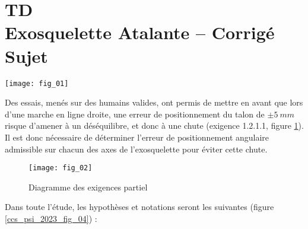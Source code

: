 \chapter*{TD  \\ 
Exosquelette Atalante -- \ifprof Corrigé \else Sujet \fi}

\iflivret {} \else
\ifprof  {} \else \fi
\fi






\begin{marginfigure}
\centering
\texttt{[image: fig\_01]}
\end{marginfigure}

Des essais, menés sur des humains valides, ont permis de mettre en avant que lors d'une marche en ligne droite, une erreur de positionnement du talon de $\pm \SI{5}{mm}$ risque d'amener à un déséquilibre, et donc à une chute (exigence 1.2.1.1, figure \ref{ccs_psi_2023_fig_02}). Il est donc nécessaire de déterminer l'erreur de positionnement angulaire admissible sur chacun des axes de l'exosquelette pour éviter cette chute.

\begin{figure}[!h]
\centering
\texttt{[image: fig\_02]}
\caption{Diagramme des exigences partiel \label{ccs_psi_2023_fig_02}}
\end{figure}


Dans toute l'étude, les hypothèses et notations seront les suivantes (figure \ref{ccs_psi_2023_fig_04}) :

